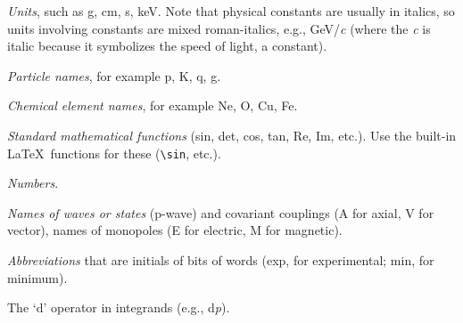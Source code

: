 \documentclass{cernphprep}
\makeatletter
\providecommand*\eg{e.g.,\xspace}
\providecommand*\etc{etc.\@\xspace}
\makeatother
\begin{document}
\begin{Itemize}
\item \emph{Units}, such as g, cm, s, keV.  Note that physical
      constants are usually in italics, so units involving constants
      are mixed roman-italics, \eg GeV/\emph{c} (where the \emph{c} is
      italic because it symbolizes the speed of light, a constant).
\item \emph{Particle names}, for example p, K, q, g.
\item \emph{Chemical element names}, for example Ne, O, Cu, Fe.
\item \emph{Standard mathematical functions} (sin, det, cos, tan, Re,
      Im, \etc).  Use the built-in \LaTeX\ functions for these
      (\verb+\sin+, etc.).
\item \emph{Numbers}.
\item \emph{Names of waves or states} (p-wave) and covariant couplings
      (A for axial, V for vector), names of monopoles (E for electric,
      M for magnetic).
\item \emph{Abbreviations} that are initials of bits of words (exp, for
      experimental; min, for minimum).
\item The `d' operator in integrands (\eg d\emph{p}).
\end{Itemize}
 
\end{document}
